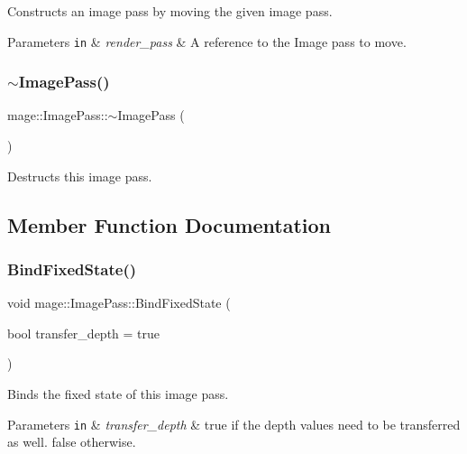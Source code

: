 Constructs an image pass by moving the given image pass.


\begin{DoxyParams}[1]{Parameters}
\mbox{\tt in}  & {\em render\+\_\+pass} & A reference to the Image pass to move. \\
\hline
\end{DoxyParams}
\hypertarget{classmage_1_1_image_pass_a599812d493826d5ebd5cd07bde97f5d1}{}\label{classmage_1_1_image_pass_a599812d493826d5ebd5cd07bde97f5d1} 
\subsubsection{\texorpdfstring{$\sim$\+Image\+Pass()}{~ImagePass()}}
{\footnotesize\ttfamily mage\+::\+Image\+Pass\+::$\sim$\+Image\+Pass (\begin{DoxyParamCaption}{ }\end{DoxyParamCaption})\hspace{0.3cm}{\ttfamily [default]}}

Destructs this image pass. 

\subsection{Member Function Documentation}
\hypertarget{classmage_1_1_image_pass_aa39b5368166ffe2ec5daff218f848d50}{}\label{classmage_1_1_image_pass_aa39b5368166ffe2ec5daff218f848d50} 
\subsubsection{\texorpdfstring{Bind\+Fixed\+State()}{BindFixedState()}}
{\footnotesize\ttfamily void mage\+::\+Image\+Pass\+::\+Bind\+Fixed\+State (\begin{DoxyParamCaption}\item[{bool}]{transfer\+\_\+depth = {\ttfamily true} }\end{DoxyParamCaption})}

Binds the fixed state of this image pass.


\begin{DoxyParams}[1]{Parameters}
\mbox{\tt in}  & {\em transfer\+\_\+depth} & {\ttfamily true} if the depth values need to be transferred as well. {\ttfamily false} otherwise. \\
\hline
\end{DoxyParams}

